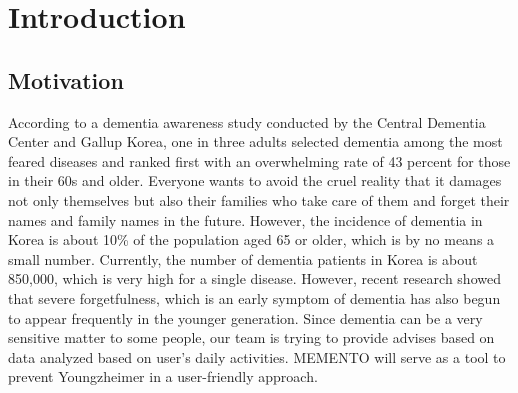 \documentclass[conference]{IEEEtran}
\begin{document}
\section{Introduction}
\subsection{Motivation}
According to a dementia awareness study conducted by the Central Dementia Center and Gallup Korea, one in three adults selected dementia among the most feared diseases and ranked first with an overwhelming rate of 43 percent for those in their 60s and older. Everyone wants to avoid the cruel reality that it damages not only themselves but also their families who take care of them and forget their names and family names in the future. However, the incidence of dementia in Korea is about 10\% of the population aged 65 or older, which is by no means a small number. Currently, the number of dementia patients in Korea is about 850,000, which is very high for a single disease. However, recent research showed that severe forgetfulness, which is an early symptom of dementia has also begun to appear frequently in the younger generation. Since dementia can be a very sensitive matter to some people, our team is trying to provide advises based on data analyzed based on user's daily activities. MEMENTO will serve as a tool to prevent Youngzheimer in a user-friendly approach. 
\end{document}
